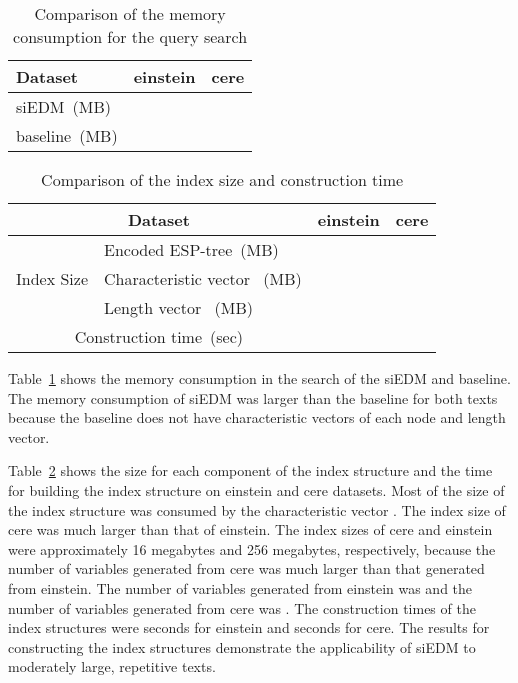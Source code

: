 \documentclass[12pt,a4paper]{scrartcl}
\begin{document}
\begin{table}
\begin{center}
  \caption{
Comparison of the memory consumption for the query search
}
\begin{tabular}{|l|r|r|}
    \hline
     Dataset                   & {\bf einstein} & {\bf cere} \\ \hline
     siEDM~(MB) &  &  \\
     baseline~(MB) &  &  \\  
     \hline
  \end{tabular}
\label{tab:memory}
\end{center}
\end{table}

\begin{table}
\begin{center}
  \caption{
Comparison of the index size and construction time
}
\begin{tabular}{|l|l|r|r|}
    \hline
     \multicolumn{2}{|c|}{Dataset} & {\bf einstein} & {\bf cere} \\ \hline

                & Encoded ESP-tree~(MB)   &  &  \\
     Index Size & Characteristic vector ~(MB)         &  &  \\
                & Length vector ~(MB)  &  &  \\
\hline
     \multicolumn{2}{|c|}{Construction time~(sec)} &  &   \\
\hline
  \end{tabular}
\label{tab:construct}
\end{center}
\end{table}

Table~\ref{tab:memory} shows the memory consumption in the search of the siEDM and baseline.
The memory consumption of siEDM was larger than the baseline for both texts
because the baseline does not have characteristic vectors of each node and length vector. 

Table~\ref{tab:construct} shows the size for each component of the index structure and the time 
for building the index structure on einstein and cere datasets. 
Most of the size of the index structure was consumed by the characteristic vector . 
The index size of cere was much larger than that of einstein. 
The index sizes of cere and einstein were approximately 16 megabytes and 256 megabytes, respectively,
because the number of variables generated from cere was much larger than that generated from einstein. 
The number of variables generated from einstein was  and the number of variables generated from cere was . 
The construction times of the index structures were  seconds for einstein and  seconds for cere. 
The results for constructing the index structures demonstrate the applicability of siEDM to moderately large, repetitive texts. 
\end{document}
